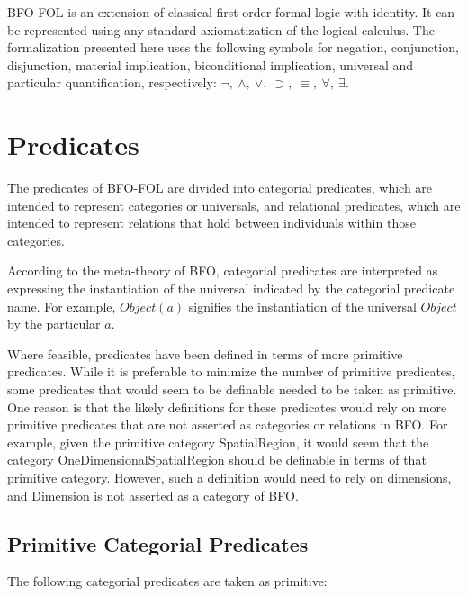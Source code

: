 \documentclass{article}
\begin{document}
BFO-FOL is an extension of classical first-order formal logic with identity. It can be represented using any standard axiomatization of the logical calculus.  The formalization presented here uses the following symbols for negation, conjunction, disjunction, material implication, biconditional implication, universal and particular quantification, respectively: ${\neg,}\ {\wedge,}\ {\vee,}\ {\supset,}\ {\equiv,}\ {\forall,}\ {\exists}$.



\section{Predicates}

The predicates of BFO-FOL are divided into categorial predicates, which are intended to represent categories or universals, and relational predicates, which are intended to represent relations that hold between individuals within those categories.  

According to the meta-theory of BFO, categorial predicates are interpreted as expressing the instantiation of the universal indicated by the categorial predicate name.  For example, $Object(a)$ signifies the instantiation of the universal $Object$ by the particular $a$.

Where feasible, predicates have been defined in terms of more primitive predicates.  While it is preferable to minimize the number of primitive predicates, some predicates that would seem to be definable needed to be taken as primitive.  One reason is that the likely definitions for these predicates would rely on more primitive predicates that are not asserted as categories or relations in BFO.  For example, given the primitive category SpatialRegion, it would seem that the category OneDimensionalSpatialRegion should be definable in terms of that primitive category.  However, such a definition would need to rely on dimensions, and Dimension is not asserted as a category of BFO.



\subsection{Primitive Categorial Predicates}

The following categorial predicates are taken as primitive:
\end{document}
